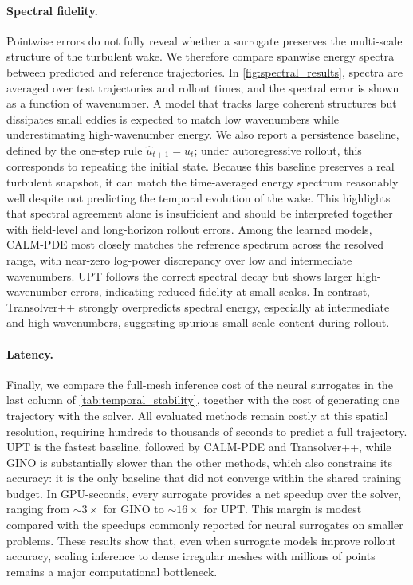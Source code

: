 \documentclass{article}
\begin{document}
\paragraph{Spectral fidelity.}
Pointwise errors do not fully reveal whether a surrogate preserves the multi-scale structure of the turbulent wake. We therefore compare \textcolor{revcolor}{spanwise} energy spectra between predicted and reference trajectories. In \autoref{fig:spectral_results}, spectra are averaged over test trajectories and rollout times, and the spectral error is shown as a function of wavenumber. A model that tracks large coherent structures but dissipates small eddies is expected to match low wavenumbers while underestimating high-wavenumber energy. We also report a persistence baseline, defined by the one-step rule \(\hat{u}_{t+1}=u_t\); under autoregressive rollout, this corresponds to repeating the initial state. Because this baseline preserves a real turbulent snapshot, it can match the time-averaged energy spectrum reasonably well despite not predicting the temporal evolution of the wake. This highlights that spectral agreement alone is insufficient and should be interpreted together with field-level and long-horizon rollout errors. Among the learned models, CALM-PDE most closely matches the reference spectrum across the resolved range, with near-zero log-power discrepancy over low and intermediate wavenumbers. UPT follows the correct spectral decay but shows larger high-wavenumber errors, indicating reduced fidelity at small scales. In contrast, Transolver++ strongly overpredicts spectral energy, especially at intermediate and high wavenumbers, suggesting spurious small-scale content during rollout.


\paragraph{Latency.}
Finally, we compare the full-mesh inference cost of the neural surrogates in the last column of \autoref{tab:temporal_stability}\textcolor{revcolor}{, together with the cost of generating one trajectory with the solver}. All evaluated methods remain costly at this spatial resolution, requiring hundreds to thousands of seconds to predict a full trajectory. UPT is the fastest baseline, followed by CALM-PDE and Transolver++, while GINO is substantially slower than the other methods\textcolor{revcolor}{, which also constrains its accuracy: it is the only baseline that did not converge within the shared training budget.} \textcolor{revcolor}{In GPU-seconds, every surrogate provides a net speedup over the solver, ranging from ${\sim}3\times$ for GINO to ${\sim}16\times$ for UPT. This margin is modest compared with the speedups commonly reported for neural surrogates on smaller problems.} These results show that, even when surrogate models improve rollout accuracy, scaling inference to dense irregular meshes with millions of points remains a major computational bottleneck.
\end{document}
